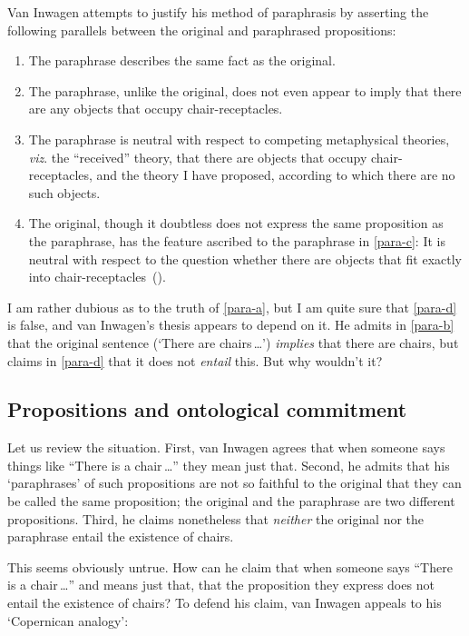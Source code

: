 \documentclass[11pt]{standalone}
\begin{document}
\begin{spacing}{1.5}
Van Inwagen attempts to justify his method of paraphrasis by asserting
the following parallels between the original and paraphrased
propositions:
\begin{enumerate}[label=(\Alph*)]
	\item The paraphrase describes the same fact as the
          original.  \label{para-a}
	\item The paraphrase, unlike the original, does not even
          appear to imply that there are any objects that occupy
          chair-receptacles.  \label{para-b}
	\item The paraphrase is neutral with respect to competing
          metaphysical theories, {\em viz}.  the ``received'' theory,
          that there are objects that occupy chair-receptacles, and
          the theory I have proposed, according to which there are no
          such objects.  \label{para-c}
	\item The original, though it doubtless does not express the
          same proposition as the paraphrase, has the feature ascribed
          to the paraphrase in \ref{para-c}: It is neutral with
          respect to the question whether there are objects that fit
          exactly into
          chair-receptacles~(\citeyear[113]{inwagen1995}).  \label{para-d}
\end{enumerate}

I am rather dubious as to the truth of \ref{para-a}, but I am quite
sure that \ref{para-d} is false, and van Inwagen's thesis appears to
depend on it.  He admits in \ref{para-b} that the original sentence
(`There are chairs\,\ldots ') {\em implies} that there are chairs, but
claims in \ref{para-d} that it does not {\em entail} this.  But why
wouldn't it?

\subsection{Propositions and ontological commitment}
Let us review the situation.  First, van Inwagen agrees that when
someone says things like ``There is a chair\,\ldots '' they mean just
that.  Second, he admits that his `paraphrases' of such propositions
are not so faithful to the original that they can be called the same
proposition; the original and the paraphrase are two different
propositions.  Third, he claims nonetheless that {\em neither} the
original nor the paraphrase entail the existence of chairs.

This seems obviously untrue.  How can he claim that when someone says
``There is a chair\,\ldots '' and means just that, that the
proposition they express does not entail the existence of chairs?  To
defend his claim, van Inwagen appeals to his `Copernican analogy':


\end{spacing}
\end{document}

